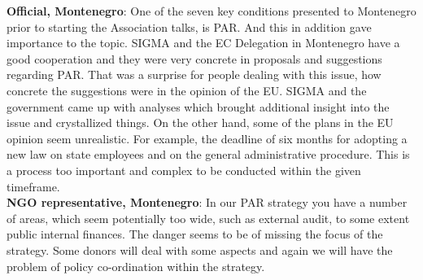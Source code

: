 \textbf{Official, Montenegro}: One of the seven key conditions presented to Montenegro prior to starting the Association talks, is PAR. And this in addition gave importance to the topic. SIGMA and the EC Delegation in Montenegro have a good cooperation and they were very concrete in proposals and suggestions regarding PAR. That was a surprise for people dealing with this issue, how concrete the suggestions were in the opinion of the EU. SIGMA and the government came up with analyses which brought additional insight into the issue and crystallized things. On the other hand, some of the plans in the EU opinion seem unrealistic. For example, the deadline of six months for adopting a new law on state employees and on the general administrative procedure. This is a process too important and complex to be conducted within the given timeframe. \\
\textbf{NGO representative, Montenegro}: In our PAR strategy you have a number of areas, which seem potentially too wide, such as external audit, to some extent public internal finances. The danger seems to be of missing the focus of the strategy. Some donors will deal with some aspects and again we will have the problem of policy co-ordination within the strategy. %
